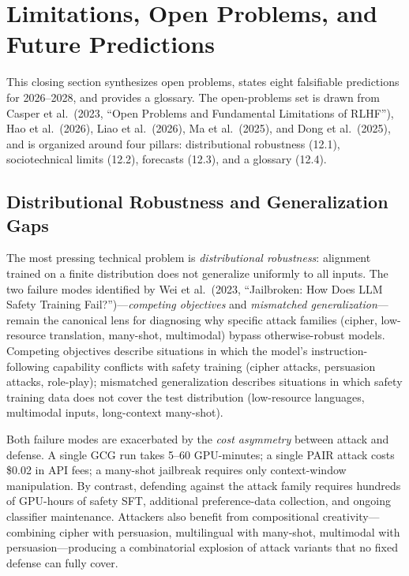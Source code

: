 \section{Limitations, Open Problems, and Future Predictions}\label{limitations-open-problems-and-future-predictions}

This closing section synthesizes open problems, states eight falsifiable predictions for 2026--2028, and provides a glossary. The open-problems set is drawn from Casper et al.~(2023, ``Open Problems and Fundamental Limitations of RLHF''), Hao et al.~(2026), Liao et al.~(2026), Ma et al.~(2025), and Dong et al.~(2025), and is organized around four pillars: distributional robustness (12.1), sociotechnical limits (12.2), forecasts (12.3), and a glossary (12.4).

\subsection{Distributional Robustness and Generalization Gaps}\label{distributional-robustness-and-generalization-gaps}

The most pressing technical problem is \emph{distributional robustness}: alignment trained on a finite distribution does not generalize uniformly to all inputs. The two failure modes identified by Wei et al.~(2023, ``Jailbroken: How Does LLM Safety Training Fail?'')---\emph{competing objectives} and \emph{mismatched generalization}---remain the canonical lens for diagnosing why specific attack families (cipher, low-resource translation, many-shot, multimodal) bypass otherwise-robust models. Competing objectives describe situations in which the model's instruction-following capability conflicts with safety training (cipher attacks, persuasion attacks, role-play); mismatched generalization describes situations in which safety training data does not cover the test distribution (low-resource languages, multimodal inputs, long-context many-shot).

Both failure modes are exacerbated by the \emph{cost asymmetry} between attack and defense. A single GCG run takes 5--60 GPU-minutes; a single PAIR attack costs \$0.02 in API fees; a many-shot jailbreak requires only context-window manipulation. By contrast, defending against the attack family requires hundreds of GPU-hours of safety SFT, additional preference-data collection, and ongoing classifier maintenance. Attackers also benefit from compositional creativity---combining cipher with persuasion, multilingual with many-shot, multimodal with persuasion---producing a combinatorial explosion of attack variants that no fixed defense can fully cover.


